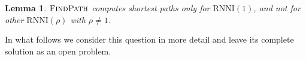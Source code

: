 \documentclass[11pt]{amsart}
\newtheorem{lemma}{Lemma}
\newcommand{\rnni}{\mathrm{RNNI}}
\newcommand{\findpath}{\textsc{FindPath}}
\begin{document}
\begin{lemma}
	$\findpath$ computes shortest paths only for $\rnni(1)$, and not for other $\rnni(\rho)$ with $\rho \neq 1$.
\end{lemma}


In what follows we consider this question in more detail and leave its complete solution as an open problem.

\newpage


\printbibliography
\end{document}
